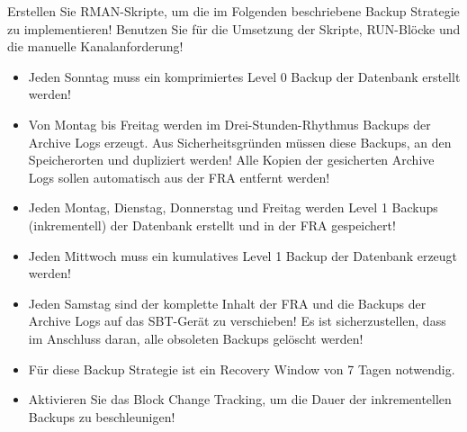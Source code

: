    \item Erstellen Sie RMAN-Skripte, um die im Folgenden beschriebene Backup Strategie zu implementieren! Benutzen Sie für die Umsetzung der Skripte, RUN-Blöcke und die manuelle Kanalanforderung!
      \begin{itemize}
        \item Jeden Sonntag muss ein komprimiertes Level 0 Backup der Datenbank erstellt werden!
        \item Von Montag bis Freitag werden im Drei-Stunden-Rhythmus Backups der Archive Logs erzeugt. Aus Sicherheitsgründen müssen diese Backups, an den Speicherorten  und  dupliziert werden! Alle Kopien der gesicherten Archive Logs sollen automatisch aus der FRA entfernt werden!
        \item Jeden Montag, Dienstag, Donnerstag und Freitag werden Level 1 Backups (inkrementell) der Datenbank erstellt und in der FRA gespeichert!
        \item Jeden Mittwoch muss ein kumulatives Level 1 Backup der Datenbank erzeugt werden!
        \item Jeden Samstag sind der komplette Inhalt der FRA und die Backups der Archive Logs auf das SBT-Gerät zu verschieben! Es ist sicherzustellen, dass im Anschluss daran, alle obsoleten Backups gelöscht werden!
        \item Für diese Backup Strategie ist ein Recovery Window von 7 Tagen notwendig.
        \item Aktivieren Sie das Block Change Tracking, um die Dauer der inkrementellen Backups zu beschleunigen!
      \end{itemize}
